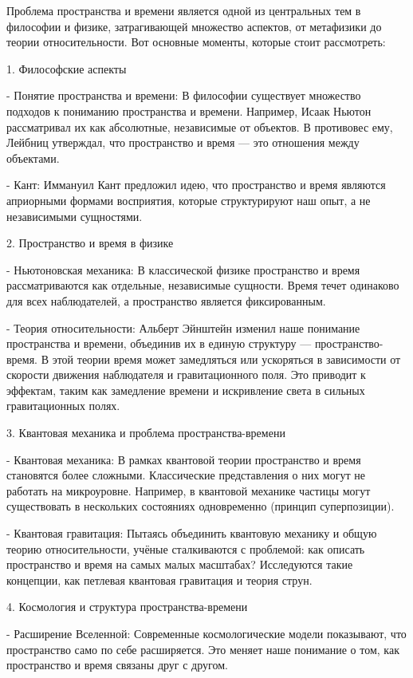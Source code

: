 \documentclass[exam_answers.tex]{subfiles}
\begin{document}
\renewcommand{\baselinestretch}{\blch}

Проблема пространства и времени является одной из центральных тем в философии и физике, затрагивающей множество аспектов, от метафизики до теории относительности. Вот основные моменты, которые стоит рассмотреть:

1. Философские аспекты

- Понятие пространства и времени: В философии существует множество подходов к пониманию пространства и времени. Например, Исаак Ньютон рассматривал их как абсолютные, независимые от объектов. В противовес ему, Лейбниц утверждал, что пространство и время — это отношения между объектами.

- Кант: Иммануил Кант предложил идею, что пространство и время являются априорными формами восприятия, которые структурируют наш опыт, а не независимыми сущностями.

2. Пространство и время в физике

- Ньютоновская механика: В классической физике пространство и время рассматриваются как отдельные, независимые сущности. Время течет одинаково для всех наблюдателей, а пространство является фиксированным.

- Теория относительности: Альберт Эйнштейн изменил наше понимание пространства и времени, объединив их в единую структуру — пространство-время. В этой теории время может замедляться или ускоряться в зависимости от скорости движения наблюдателя и гравитационного поля. Это приводит к эффектам, таким как замедление времени и искривление света в сильных гравитационных полях.

3. Квантовая механика и проблема пространства-времени

- Квантовая механика: В рамках квантовой теории пространство и время становятся более сложными. Классические представления о них могут не работать на микроуровне. Например, в квантовой механике частицы могут существовать в нескольких состояниях одновременно (принцип суперпозиции).

- Квантовая гравитация: Пытаясь объединить квантовую механику и общую теорию относительности, учёные сталкиваются с проблемой: как описать пространство и время на самых малых масштабах? Исследуются такие концепции, как петлевая квантовая гравитация и теория струн.

4. Космология и структура пространства-времени

- Расширение Вселенной: Современные космологические модели показывают, что пространство само по себе расширяется. Это меняет наше понимание о том, как пространство и время связаны друг с другом.
\end{document}
